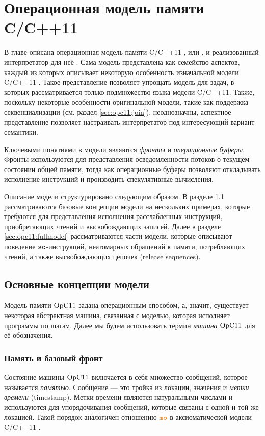 \chapter{Операционная модель памяти C/C++11} \label{sec:opc11}
В главе описана операционная модель памяти C/C++11 \cite{Podkopaev-al:CoRR16}, или \OpCpp,
и реализованный интерпретатор для неё .
Сама модель представлена как семейство аспектов, каждый из которых описывает некоторую особенность
изначальной модели C/C++11 \cite{Batty-al:POPL11}.
Такое представление позволяет упрощать модель для задач, в которых рассматривается только подмножество
языка модели C/C++11.
Также, поскольку некоторые особенности оригинальной модели, такие как поддержка секвенциализации (см. раздел \ref{sec:opc11:join}),
неоднозначны, аспектное представление позволяет настраивать интерпретатор под интересующий вариант семантики.

Ключевыми понятиями в модели являются \emph{фронты} и \emph{операционные буферы}.
Фронты используются для представления осведомленности потоков о текущем состоянии общей памяти,
тогда как операционные буферы позволяют откладывать исполнение инструкций и
производить спекулятивные вычисления.


Описание модели структурировано следующим образом.
В разделе \ref{sec:opc11:base} рассматриваются базовые концепции модели на нескольких примерах,
которые требуются для представления исполнения расслабленных инструкций, приобретающих чтений и
высвобождающих записей.
Далее в разделе \ref{sec:opc11:fullmodel} рассматриваются части модели, которые описывают
поведение ${\mathtt{sc}}$-инструкций, неатомарных обращений к памяти, потребляющих чтений, а также
высвобождающих цепочек (release sequences).

\section{Основные концепции модели}
\label{sec:opc11:base}
Модель памяти $\mathrm{OpC11}$ задана операционным способом, а, значит, существует
некоторая абстрактная машина, связанная с моделью, которая исполняет программы
по шагам. Далее мы будем использовать термин \emph{машина} $\mathrm{OpC11}$ для её обозначения.

\subsection{Память и базовый фронт}
Состояние машины $\mathrm{OpC11}$ включается в себя множество сообщений, которое называется 
\emph{памятью}. Сообщение --- это тройка из локации, значения и \emph{метки времени} (timestamp).
Метки времени являются натуральными числами и используются для упорядочивания сообщений, которые связаны с одной и той же локацией.
Такой порядок аналогичен отношению $\lMO$ в аксиоматической модели C/C++11 \cite{Batty-al:POPL11}.

